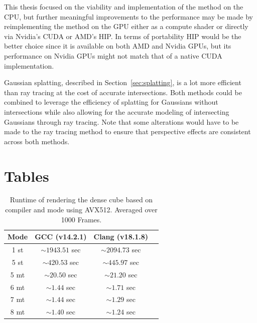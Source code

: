 \documentclass[a4paper, 11pt]{memoir}
\begin{document}
    This thesis focused on the viability and implementation of the method on the CPU, but further meaningful improvements
    to the performance may be made by reimplementing the method on the GPU either as a compute shader or directly via
    Nvidia's CUDA or AMD's HIP. In terms of portability HIP would be the better choice since it is available on both AMD
    and Nvidia GPUs, but its performance on Nvidia GPUs might not match that of a native CUDA implementation.

    Gaussian splatting, described in Section~\ref{sec:splatting}, is a lot more efficient than ray tracing at the cost
    of accurate intersections. Both methods could be combined to leverage the efficiency of splatting for Gaussians
    without intersections while also allowing for the accurate modeling of intersecting Gaussians through ray tracing.
    Note that some alterations would have to be made to the ray tracing method to ensure that perspective effects are
    consistent across both methods.

    \appendix
    \chapter{Tables}
    \label{ch:tables}
    \begin{table}[ht]
        \centering
        \begin{tabular}{|c | c | c | c|}
            \hline
            Mode & GCC (v14.2.1)     & Clang (v18.1.8)\\\hline
            1 st & $\sim1943.51$ sec & $\sim2094.73$ sec\\
            5 st & $\sim420.53$ sec  & $\sim445.97$ sec\\
            5 mt & $\sim20.50$ sec   & $\sim21.20$ sec \\
            6 mt & $\sim1.44$ sec    & $\sim1.71$ sec \\
            7 mt & $\sim1.44$ sec    & $\sim1.29$ sec \\
            8 mt & $\sim1.40$ sec    & $\sim1.24$ sec \\
            \hline
        \end{tabular}
        \caption{Runtime of rendering the dense cube based on compiler and mode using AVX512. Averaged over 1000 Frames.}
        \label{tab:perf_dense_cube_avx512}
    \end{table}
\end{document}
